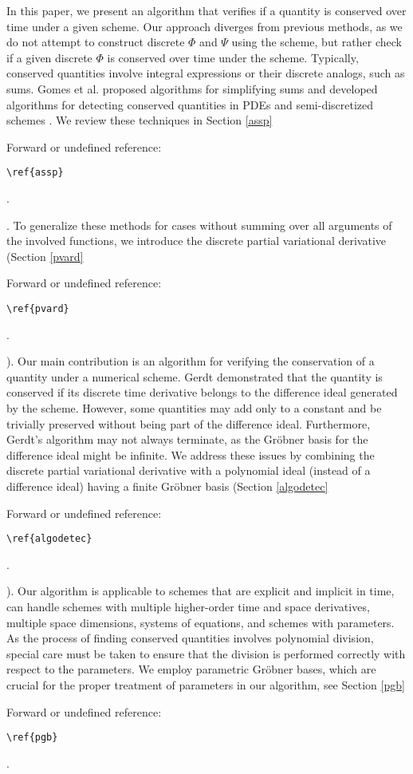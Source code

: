 \documentclass[runningheads]{llncs}
\newcommand{\1}{\chi}
\begin{document}
In this paper, we present an algorithm that verifies if a quantity is conserved over time under a given scheme. Our approach diverges from previous methods, as we do not attempt to construct discrete \(\Phi\) and \(\Psi\) using the scheme, but rather check if a given discrete \(\Phi\) is conserved over time under the scheme. Typically, conserved quantities involve integral expressions or their discrete analogs, such as sums. Gomes et al. proposed algorithms for simplifying sums \cite{gomes20} and developed algorithms for detecting conserved quantities in PDEs and semi-discretized schemes \cite{gomes20}. We review these techniques in Section \ref{assp}
 {\color{red} Forward or undefined reference: \begin{verbatim}\ref{assp}\end{verbatim}.}
.
To generalize these methods for cases without summing over all arguments of the involved functions, we introduce the discrete partial variational derivative (Section \ref{pvard}
 {\color{red} Forward or undefined reference: \begin{verbatim}\ref{pvard}\end{verbatim}.}
). Our main contribution is an algorithm for verifying the conservation of a quantity under a numerical scheme. Gerdt \cite{gerdt12} demonstrated that the quantity is conserved if its discrete time derivative belongs to the difference ideal generated by the scheme. However, some quantities may add only to a constant and be trivially preserved without being part of the difference ideal. Furthermore, Gerdt's algorithm may not always terminate, as the Gr{\"o}bner basis for the difference ideal might be infinite.
We address these issues by combining the discrete partial variational derivative with a polynomial ideal (instead of a difference ideal) having a finite Gr{\"o}bner basis (Section \ref{algodetec}
 {\color{red} Forward or undefined reference: \begin{verbatim}\ref{algodetec}\end{verbatim}.}
). Our algorithm is applicable to schemes that are explicit and implicit in time, can handle schemes with multiple higher-order time and space derivatives, multiple space dimensions, systems of equations, and schemes with parameters.
As the process of finding conserved quantities involves polynomial division, special care must be taken to ensure that the division is performed correctly with respect to the parameters. We employ parametric Gr{\"o}bner  bases, which are crucial for the proper treatment of parameters in our algorithm, see Section \ref{pgb}
 {\color{red} Forward or undefined reference: \begin{verbatim}\ref{pgb}\end{verbatim}.}
\end{document}
